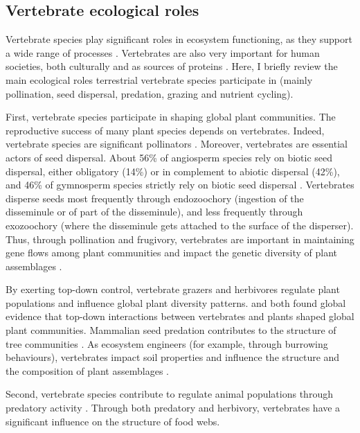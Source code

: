 \subsection{Vertebrate ecological roles}
Vertebrate species play significant roles in ecosystem functioning, as they support a wide range of processes \citep{Sekercioglu2006, Severtsov2013, Hocking2014a}. Vertebrates are also very important for human societies, both culturally and as sources of proteins \citep{Albert2018, Hirons2016,Alves2018}. Here, I briefly review the main ecological roles terrestrial vertebrate species participate in (mainly pollination, seed dispersal, predation, grazing and nutrient cycling).

First, vertebrate species participate in shaping global plant communities. The reproductive success of many plant species depends on vertebrates. Indeed, vertebrate species are significant pollinators \citep{Ratto2018}. Moreover, vertebrates are essential actors of seed dispersal. About 56\% of angiosperm species rely on biotic seed dispersal, either obligatory (14\%) or in complement to abiotic dispersal (42\%), and 46\% of gymnosperm species strictly rely on biotic seed dispersal \citep{Tiffney2004}. Vertebrates disperse seeds most frequently through endozoochory (ingestion of the disseminule or of part of the disseminule), and less frequently through exozoochory (where the disseminule gets attached to the surface of the disperser). Thus, through pollination and frugivory, vertebrates are important in maintaining gene flows among plant communities and impact the genetic diversity of plant assemblages \citep{Calvino-Cancela2012}.

By exerting top-down control, vertebrate grazers and herbivores regulate plant populations and influence global plant diversity patterns. \citet{Lin2018} and \citet{Zhang2018} both found global evidence that top-down interactions between vertebrates and plants shaped global plant communities. Mammalian seed predation contributes to the structure of tree communities \citep{Paine2016}. As ecosystem engineers (for example, through burrowing behaviours), vertebrates impact soil properties and influence the structure and the composition of plant assemblages \citep{Sekercioglu2006, Severtsov2013}.

Second, vertebrate species contribute to regulate animal populations through predatory activity \citep{Barber2010,Letnic2012, Luck2012, Salo2010}. Through both predatory and herbivory, vertebrates have a significant influence on the structure of food webs. 

